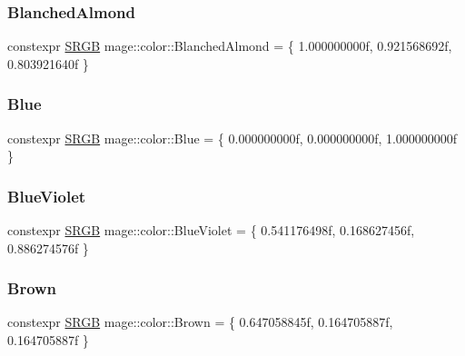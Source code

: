 \subsubsection{\texorpdfstring{Blanched\+Almond}{BlanchedAlmond}}
{\footnotesize\ttfamily constexpr \hyperlink{structmage_1_1_s_r_g_b}{S\+R\+GB} mage\+::color\+::\+Blanched\+Almond = \{ 1.\+000000000f, 0.\+921568692f, 0.\+803921640f \}}

\hypertarget{namespacemage_1_1color_a8b0d8d20e1a27b4ccb8f3c6763c7e3d3}{}\label{namespacemage_1_1color_a8b0d8d20e1a27b4ccb8f3c6763c7e3d3} 
\subsubsection{\texorpdfstring{Blue}{Blue}}
{\footnotesize\ttfamily constexpr \hyperlink{structmage_1_1_s_r_g_b}{S\+R\+GB} mage\+::color\+::\+Blue = \{ 0.\+000000000f, 0.\+000000000f, 1.\+000000000f \}}

\hypertarget{namespacemage_1_1color_ad8b10d4a3479f7dcd825ec304f23fa2f}{}\label{namespacemage_1_1color_ad8b10d4a3479f7dcd825ec304f23fa2f} 
\subsubsection{\texorpdfstring{Blue\+Violet}{BlueViolet}}
{\footnotesize\ttfamily constexpr \hyperlink{structmage_1_1_s_r_g_b}{S\+R\+GB} mage\+::color\+::\+Blue\+Violet = \{ 0.\+541176498f, 0.\+168627456f, 0.\+886274576f \}}

\hypertarget{namespacemage_1_1color_aa05e52edf0ad1dcfea8ff43e664ac0c9}{}\label{namespacemage_1_1color_aa05e52edf0ad1dcfea8ff43e664ac0c9} 
\subsubsection{\texorpdfstring{Brown}{Brown}}
{\footnotesize\ttfamily constexpr \hyperlink{structmage_1_1_s_r_g_b}{S\+R\+GB} mage\+::color\+::\+Brown = \{ 0.\+647058845f, 0.\+164705887f, 0.\+164705887f \}}

\hypertarget{namespacemage_1_1color_a3e345567ebc754dcb87fc0793a8e0a79}{}\label{namespacemage_1_1color_a3e345567ebc754dcb87fc0793a8e0a79} 
